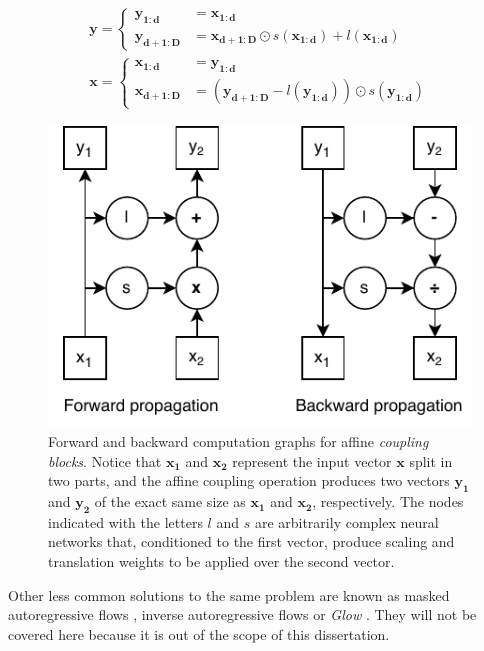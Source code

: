 \begin{equation}
\label{eq:affinecouplingblock}
\begin{gathered}
	 \mathbf{y} = \begin{cases} \mathbf{y_{1: d}} & = \mathbf{x_{1: d}} \\
	\mathbf{y_{d+1: D}} & =\mathbf{x_{d+1: D}} \odot s\left(\mathbf{x_{1: d}}\right)+l\left(\mathbf{x_{1: d}}\right)\end{cases} \\
	\mathbf{x} = \begin{cases}
	\mathbf{x_{1: d}} &=\mathbf{y_{1: d}} \\
	\mathbf{x_{d+1: D}} &=\left(\mathbf{y_{d+1: D}}-l\left(\mathbf{y_{1: d}}\right)\right) \odot s\left(\mathbf{y_{1: d}}\right)
	\end{cases}
\end{gathered}
\end{equation}

\begin{figure}
	\centering
	\includegraphics[width=0.7\linewidth]{chapter2/images/affinecouplingblock}
	\caption{Forward and backward computation graphs for affine \textit{coupling blocks}. Notice that $\mathbf{x_1}$ and $\mathbf{x_2}$ represent the input vector $\mathbf{x}$ split in two parts, and the affine coupling operation produces two vectors $\mathbf{y_1}$ and $\mathbf{y_2}$ of the exact same size as $\mathbf{x_1}$ and $\mathbf{x_2}$, respectively. The nodes indicated with the letters $l$ and $s$ are arbitrarily complex neural networks that, conditioned to the first vector, produce scaling and translation weights to be applied over the second vector.}
	\label{fig:affinecouplingblock}
\end{figure}


Other less common solutions to the same problem are known as masked autoregressive flows \autocite{papamakarios2017}, inverse autoregressive flows \autocite{kingma2016} or \textit{Glow} \autocite{kingma2018}. They will not be covered here because it is out of the scope of this dissertation.


